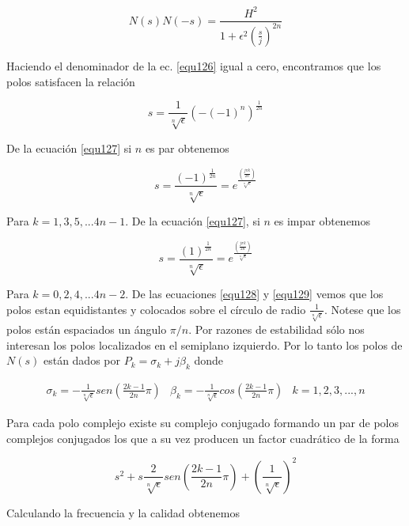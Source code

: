 \documentclass[12pt]{book}
\theoremstyle{definition}
\theoremstyle{remark}
\theoremstyle{plain}
\begin{document}
\begin{equation}
N(s) N(-s) = \frac{H^2}{1+\epsilon ^2 (\frac{s}{j})^{2 n}}
\label{equ126}
\end{equation}

Haciendo el denominador de la ec. \ref{equ126} igual a cero, encontramos que los polos satisfacen la relación

\begin{equation}
s = \frac{1}{\sqrt[n]{\epsilon}}(-(-1)^n)^{\frac{1}{2 n}}
\label{equ127}
\end{equation}

De la ecuación \ref{equ127} si $n$ es par obtenemos

\begin{equation}
s = \frac{(-1)^{\frac{1}{2n}}}{\sqrt[n]{\epsilon}}= e^{\frac{(\frac{j \pi k} { 2n})}{\sqrt[n]{\epsilon}}}
\label{equ128}
\end{equation}

Para $k=1,3,5,... 4n-1$. De la ecuación \ref{equ127}, si $n$ es impar obtenemos

\begin{equation}
s = \frac{(1)^{\frac{1}{2n}}}{\sqrt[n]{\epsilon}}= e^{\frac{(\frac{j \pi k} { 2n})}{\sqrt[n]{\epsilon}}}
\label{equ129}
\end{equation}

Para $k=0,2,4,... 4n-2$. De las ecuaciones \ref{equ128} y \ref{equ129} vemos que los polos estan equidistantes y colocados sobre el círculo de radio $\frac{1}{\sqrt[n]{\epsilon}}$. Notese que los polos están espaciados un ángulo $\pi/n$. Por razones de estabilidad  sólo nos interesan los polos localizados en el semiplano izquierdo. Por lo tanto los polos de $N(s)$ están dados por $P_k=\sigma_k+j\beta _k$ donde

\begin{eqnarray}
\sigma_k = - \frac{1}{\sqrt[n]{\epsilon}} sen (\frac{2k-1}{2n}\pi) & \beta_k = - \frac{1}{\sqrt[n]{\epsilon}} cos (\frac{2k-1}{2n}\pi) & k = 1,2,3,...,n
\end{eqnarray}

Para cada polo complejo existe su complejo conjugado formando un par de polos complejos conjugados los que a su vez producen un factor cuadrático de la forma

\begin{equation}
s^2+ s \frac{2}{\sqrt[n]{\epsilon}} sen (\frac{2k-1}{2n}\pi)+(\frac{1}{\sqrt[n]{\epsilon}})^2
\label{equ130}
\end{equation}

Calculando la frecuencia y la calidad obtenemos
\end{document}
